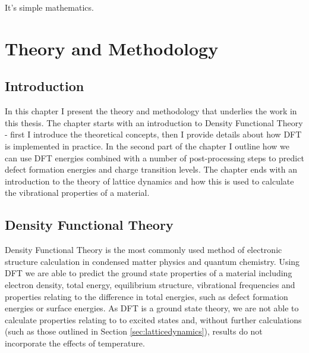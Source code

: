 \begin{savequote}[8cm]
It's simple mathematics.
\end{savequote}

\chapter{\label{ch:3-methods}Theory and Methodology}

\minitoc



\section{Introduction} 

In this chapter I present the theory and methodology that underlies the work in this thesis. The chapter starts with an introduction to Density Functional Theory - first I introduce the theoretical concepts, then I provide details about how DFT is implemented in practice. In the second part of the chapter I outline how we can use DFT energies combined with a number of post-processing steps to predict defect formation energies and charge transition levels. The chapter ends with an introduction to the theory of lattice dynamics and how this is used to calculate the vibrational properties of a material. 

\section{Density Functional Theory} \label{DFTtheory}

Density Functional Theory is the most commonly used method of electronic structure calculation in condensed matter physics and quantum chemistry. 
Using DFT we are able to predict the ground state properties of a material including electron density, total energy, equilibrium structure, vibrational frequencies and properties relating to the difference in total energies, such as defect formation energies or surface energies. 
As DFT is a ground state theory, we are not able to calculate properties relating to to excited states and, without further calculations (such as those outlined in Section \ref{sec:latticedynamics}), results do not incorporate the effects of temperature. 

